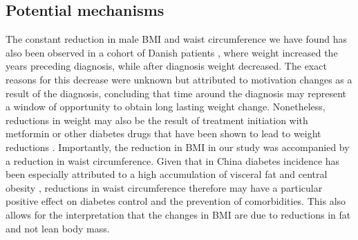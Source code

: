 \subsection{Potential mechanisms}

The constant reduction in male \ac{BMI} and waist circumference we have found has also been observed in a cohort of Danish patients \autocite{DeFineOlivarius2015}, where weight increased the years preceding diagnosis, while after diagnosis weight decreased. The exact reasons for this decrease were unknown but attributed to motivation changes as a result of the diagnosis, concluding that time around the diagnosis may represent a window of opportunity to obtain long lasting weight change. Nonetheless, reductions in weight may also be the result of treatment initiation with metformin or other diabetes drugs that have been shown to lead to weight reductions \autocite{Yang2014}. Importantly, the reduction in \ac{BMI} in our study was accompanied by a reduction in waist circumference.  Given that in China diabetes incidence has been especially attributed to a high accumulation of visceral fat and central obesity \autocite{Ma2014}, reductions in waist circumference therefore may have a particular positive effect on diabetes control and the prevention of comorbidities. This also allows for the interpretation  that the changes in \ac{BMI} are due to reductions in fat and not lean body mass\autocite{Klein2007}.

